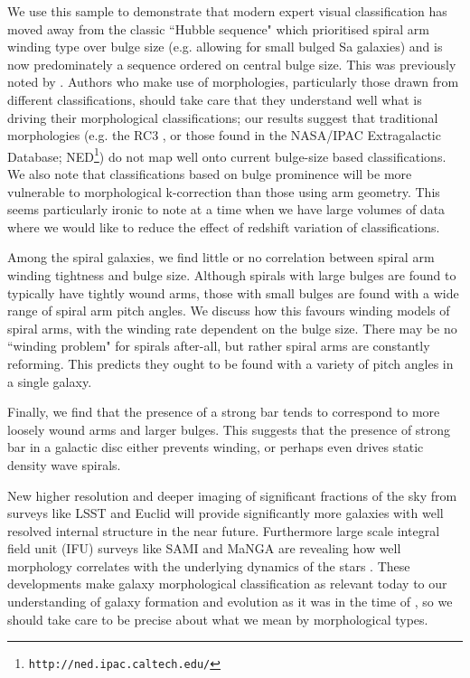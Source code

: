 \documentclass[usenatbib]{mn2e}
\begin{document}
 We use this sample to demonstrate that modern expert visual classification has moved away from the classic ``Hubble sequence" which prioritised spiral arm winding type over bulge size (e.g. allowing for small bulged Sa galaxies) and is now predominately a sequence ordered on central bulge size. This was previously noted by \citet{Willett2013}. Authors who make use of morphologies, particularly those drawn from different classifications, should take care that they understand well what is driving their morphological classifications; our results suggest that traditional morphologies (e.g. the RC3 \citep{1991rc3..book.....D}, or those found in the NASA/IPAC Extragalactic Database; NED\footnote{\tt http://ned.ipac.caltech.edu/}) do not map well onto current bulge-size based classifications. We also note that classifications based on bulge prominence will be more vulnerable to morphological k-correction 
than those using arm geometry. This seems particularly ironic to note at a time when we have large volumes of data where we would like to reduce the effect of redshift variation of classifications. 
 
Among the spiral galaxies, we find little or no correlation between spiral arm winding tightness and bulge size. Although spirals with large bulges are found to typically have tightly wound  arms, those with small bulges are found with a wide range of spiral arm pitch angles. We discuss how this favours winding models of spiral arms, with the winding rate dependent on the bulge size. There may be no ``winding problem" for spirals after-all, but rather spiral arms are constantly reforming. This predicts they ought to be found with a variety of pitch angles in a single galaxy. 

Finally, we find that the presence of a strong bar tends to correspond to more loosely wound arms and larger bulges. This suggests that the presence of strong bar in a galactic disc either prevents winding, or perhaps even drives static density wave spirals. 

 New higher resolution and deeper imaging of significant fractions of the sky from surveys like LSST and Euclid will provide significantly more galaxies with well resolved internal structure in the near future. Furthermore large scale integral field unit (IFU) surveys like SAMI \citep{Bryant2015} and MaNGA \citep{Bundy2015} are revealing how well morphology correlates with the underlying dynamics of the stars \citep{Foster2018}. These developments make galaxy morphological classification as relevant today to our understanding of galaxy formation and evolution as it was in the time of \citet{Hubble1926}, so we should take care to be precise about what we mean by morphological types. %
  
\end{document}
